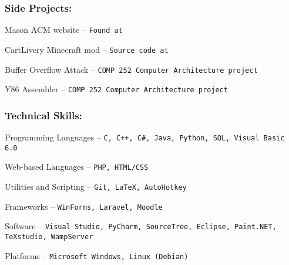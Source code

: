 \documentclass[12pt]{article}
\begin{document}
\subsubsection*{\color{head}Side Projects:}
\begin{compactitem}
	\item {\color{accent} Mason ACM website} -- \texttt{Found at \underline{}}
	\item {\color{accent} CartLivery Minecraft mod} -- \texttt{Source code at \underline{}}
	\item {\color{accent} Buffer Overflow Attack} -- \texttt{COMP 252 Computer Architecture project}
	\item {\color{accent} Y86 Assembler} -- \texttt{COMP 252 Computer Architecture project}
\end{compactitem}

\subsubsection*{\color{head}Technical Skills:}
\begin{compactitem}
	\item {\color{accent} Programming Languages} -- \texttt{C, C++, C\#, Java, Python, SQL, Visual Basic 6.0}
	\item {\color{accent} Web-based Languages} -- \texttt{PHP, HTML/CSS}
	\item {\color{accent} Utilities and Scripting} -- \texttt{Git, LaTeX, AutoHotkey}
	\item {\color{accent} Frameworks} -- \texttt{WinForms, Laravel, Moodle}
	\item {\color{accent} Software} -- \texttt{Visual Studio, PyCharm, SourceTree, Eclipse, Paint.NET, TeXstudio, WampServer}
	\item {\color{accent} Platforms} -- \texttt{Microsoft Windows, Linux (Debian)}
\end{compactitem}
\end{document}
